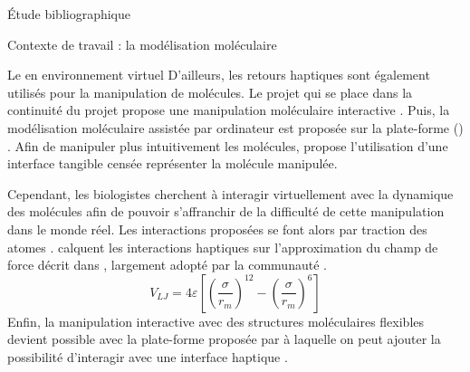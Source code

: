 \documentclass[myfrancais,ngerman,english,frenchb]{mythesis}
\begin{document}
\begin{mychapter}{Étude bibliographique}
\begin{mysection}{Contexte de travail : la modélisation moléculaire}
\begin{mysubsection}{Le  en environnement virtuel}
				D'ailleurs, les retours haptiques sont également utilisés pour la manipulation de molécules.
				Le projet \myGROPEHaptic qui se place dans la continuité du projet \myGROPE propose une manipulation moléculaire interactive .
				Puis, la modélisation moléculaire assistée par ordinateur est proposée sur la plate-forme \myHIMM () .
				Afin de manipuler plus intuitivement les molécules,  propose l'utilisation d'une interface tangible censée représenter la molécule manipulée.

				Cependant, les biologistes cherchent à interagir virtuellement avec la dynamique des molécules afin de pouvoir s'affranchir de la difficulté de cette manipulation dans le monde réel.
				Les interactions proposées se font alors par traction des atomes .
				 calquent les interactions haptiques sur l'approximation du champ de force décrit dans  , largement adopté par la communauté .
				\begin{equation}\label{eq-sota-PotentielDeLennardJones}
					V_{LJ} = 4\varepsilon \left[\left(\frac{\sigma}{r_m}\right)^{12} - \left(\frac{\sigma}{r_m}\right)^6\right]
				\end{equation}
				Enfin, la manipulation interactive avec des structures moléculaires flexibles devient possible avec la plate-forme proposée par  à laquelle on peut ajouter la possibilité d'interagir avec une interface haptique .


\end{mysubsection}
\end{mysection}
\end{mychapter}
\end{document}
